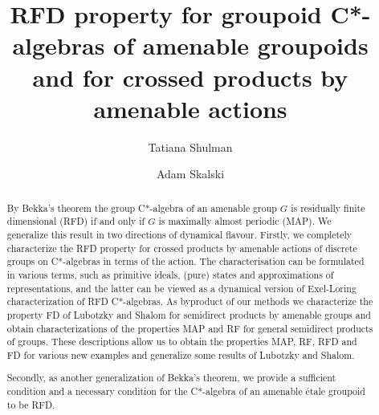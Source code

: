 \documentclass[11 pt, leqno, hidelinks]{amsart}%
\theoremstyle{plain}
\numberwithin{equation}{section}
\begin{document}
\author{Tatiana Shulman}
\address{Department of Mathematical Sciences, Chalmers University of Technology, Chalmers tvärgata 3, 412 96 Gothenburg, Sweden}

\author{Adam Skalski}
\address{Institute of Mathematics of the Polish Academy of Sciences,
		ul.~\'Sniadeckich 8, 00--656 Warszawa, Poland}

\title[RFD for groupoids and crossed products]{RFD property for groupoid C*-algebras of amenable groupoids and for crossed products  by amenable actions}



\begin{abstract} By Bekka's theorem the group C*-algebra of an amenable group $G$ is residually finite dimensional (RFD) if and only if $G$ is  maximally almost periodic (MAP). We generalize this result in two directions of dynamical flavour. Firstly, we completely characterize the RFD property for crossed products by amenable actions of discrete groups on C*-algebras in terms of the action. The characterisation can be formulated in various terms,  such as primitive ideals, (pure) states and approximations of representations, and the latter can be viewed as a dynamical version of Exel-Loring characterization of RFD C*-algebras.
As byproduct of our methods we characterize the property FD of Lubotzky and Shalom for semidirect products by amenable groups and obtain characterizations of the properties MAP  and RF for general semidirect products of groups. These descriptions allow us to obtain the properties  MAP, RF, RFD and FD for various new examples and generalize some results of Lubotzky and Shalom.

Secondly,  as another generalization of Bekka's theorem, we
provide a sufficient condition and a necessary condition for  the C*-algebra of an amenable \'etale groupoid to be RFD.
\end{abstract}



\maketitle
\end{document}
